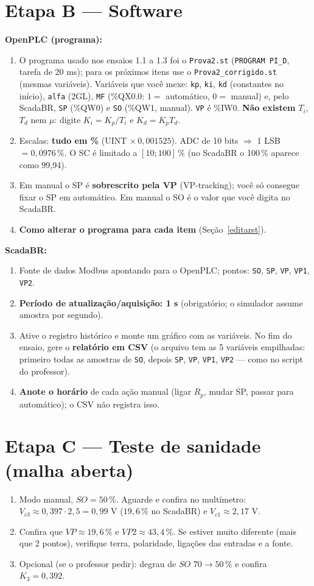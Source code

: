 \documentclass[11pt,a4paper]{article}
\newcommand{\Vc}[1]{V_{c#1}}
\begin{document}
\section{Etapa B --- Software}
\textbf{OpenPLC (programa):}
\begin{enumerate}
\item O programa usado nos ensaios 1.1 a 1.3 foi o \texttt{Prova2.st} (\texttt{PROGRAM PI\_D}, tarefa de 20 ms); para os próximos itens use o \texttt{Prova2\_corrigido.st} (mesmas variáveis). Variáveis que você mexe: \texttt{kp}, \texttt{ki}, \texttt{kd} (constantes no início), \texttt{alfa} (2GL), \texttt{MF} (\%QX0.0: $1=$ automático, $0=$ manual) e, pelo ScadaBR, \texttt{SP} (\%QW0) e \texttt{SO} (\%QW1, manual). \texttt{VP} é \%IW0. \textbf{Não existem} $T_i$, $T_d$ nem $\mu$: digite $K_i=K_p/T_i$ e $K_d=K_pT_d$.
\item Escalas: \textbf{tudo em \%} (UINT $\times\,0{,}001525$). ADC de 10 bits $\Rightarrow$ 1 LSB $=0{,}0976\,\%$. O SC é limitado a $[10;100]\,\%$ (no ScadaBR o 100\,\% aparece como 99,94).
\item Em manual o SP é \textbf{sobrescrito pela VP} (VP-tracking); você só consegue fixar o SP em automático. Em manual o SO é o valor que você digita no ScadaBR.
\item \textbf{Como alterar o programa para cada item} (Seção~\ref{editarst}).
\end{enumerate}
\textbf{ScadaBR:}
\begin{enumerate}
\item Fonte de dados Modbus apontando para o OpenPLC; pontos: \texttt{SO}, \texttt{SP}, \texttt{VP}, \texttt{VP1}, \texttt{VP2}.
\item \textbf{Período de atualização/aquisição: 1 s} (obrigatório; o simulador assume amostra por segundo).
\item Ative o registro histórico e monte um gráfico com as variáveis. No fim do ensaio, gere o \textbf{relatório em CSV} (o arquivo tem as 5 variáveis empilhadas: primeiro todas as amostras de \texttt{SO}, depois \texttt{SP}, \texttt{VP}, \texttt{VP1}, \texttt{VP2} --- como no script do professor).
\item \textbf{Anote o horário} de cada ação manual (ligar $R_p$, mudar SP, passar para automático); o CSV não registra isso.
\end{enumerate}

\section{Etapa C --- Teste de sanidade (malha aberta)}
\begin{enumerate}
\item Modo manual, $SO=50\,\%$. Aguarde e confira no multímetro: $\Vc3\approx0{,}397\cdot2{,}5=0{,}99$ V ($19{,}6\,\%$ no ScadaBR) e $\Vc1\approx2{,}17$ V.
\item Confira que $VP\approx19{,}6\,\%$ e $VP2\approx43{,}4\,\%$. Se estiver muito diferente (mais que 2 pontos), verifique terra, polaridade, ligações das entradas e a fonte.
\item Opcional (se o professor pedir): degrau de $SO$ $70\to50\,\%$ e confira $K_3=0{,}392$.
\end{enumerate}
\end{document}
